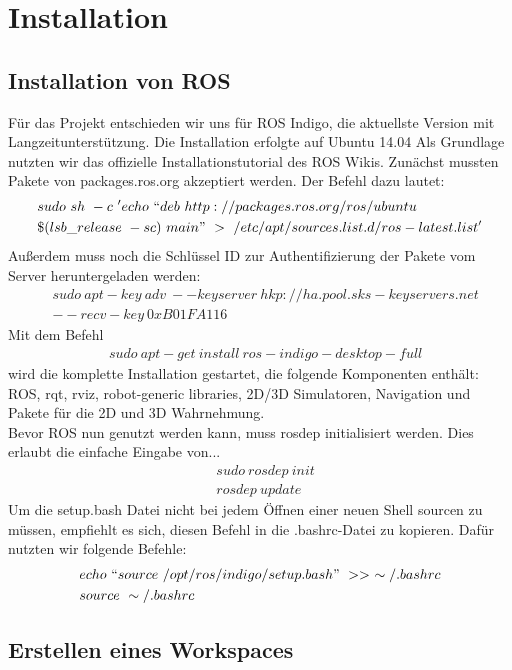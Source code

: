\documentclass{scrartcl}
\begin{document}
\section{Installation}


\subsection{Installation von ROS}

Für das Projekt entschieden wir uns für ROS Indigo, die aktuellste Version mit Langzeitunterstützung.
Die Installation erfolgte auf Ubuntu 14.04 
Als Grundlage nutzten wir das offizielle Installationstutorial des ROS Wikis.
Zunächst mussten Pakete von packages.ros.org akzeptiert werden. Der Befehl dazu lautet: 
\begin{align}
&sudo\ sh\ -c\ 'echo\ ``deb\ http://packages.ros.org/ros/ubuntu \\ 
&\$(lsb\_release\ -sc)\ main"\ >\ /etc/apt/sources.list.d/ros-latest.list'
\end{align}
Außerdem muss noch die Schlüssel ID  zur Authentifizierung der Pakete vom Server heruntergeladen werden:
\begin{align}
&sudo\ apt-key\ adv\ --keyserver\ hkp://ha.pool.sks-keyservers.net\\ 
& --recv-key\ 0xB01FA116
\end{align}
Mit dem Befehl 
\begin{align}
&sudo\ apt-get\ install\ ros-indigo-desktop-full
\end{align}
wird die komplette Installation gestartet, die folgende Komponenten enthält: ROS, rqt, rviz, robot-generic libraries, 2D/3D Simulatoren, Navigation und Pakete für die 2D und 3D Wahrnehmung.
\\
Bevor ROS nun genutzt werden kann, muss rosdep initialisiert werden. Dies erlaubt die einfache Eingabe von...
\begin{align}
&sudo\ rosdep\ init\\
&rosdep\ update
\end{align}
Um die setup.bash Datei nicht bei jedem Öffnen einer neuen Shell sourcen zu müssen, empfiehlt es sich, diesen Befehl in die .bashrc-Datei zu kopieren.
Dafür nutzten wir folgende Befehle:
\begin{align}
&echo\ ``source\ /opt/ros/indigo/setup.bash"\ >>\ \sim/.bashrc\\
&source\ \sim/.bashrc
\end{align}

\subsection{Erstellen eines Workspaces}
\end{document}
